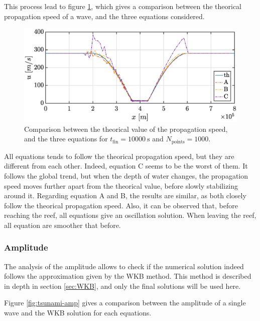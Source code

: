 \documentclass[a4paper,12pt,twoside]{article}
\begin{document}
        This process lead to figure \ref{fig:tsunami_speed}, which gives a comparison between the theorical propagation speed of a wave, and the three equations considered.

        \begin{figure}[h]
          \centering
          \includegraphics[width=\textwidth]{graphs/tsunami_speed.eps}
          \caption{Comparison between the theorical value of the propagation speed, and the three equations for $t_\text{fin} = \SI{10000}{\s}$ and $N_\text{points} = \num{1000}$.}
          \label{fig:tsunami_speed}
        \end{figure}

        All equations tends to follow the theorical propagation speed, but they are different from each other.
        Indeed, equation C seems to be the worst of them.
        It follows the global trend, but when the depth of water changes, the propagation speed moves further apart from the theorical value, before slowly stabilizing around it.
        Regarding equation A and B, the results are similar, as both closely follow the theorical propagation speed.
        Also, it can be observed that, before reaching the reef, all equations give an oscillation solution.
        When leaving the reef, all equation are smoother that before. %

      \subsubsection{Amplitude}
      The analysis of the amplitude allows to check if the numerical solution indeed follows the approximation given by the WKB method.
      This method is described in depth in section \ref{sec:WKB}, and only the final solutions will be used here.

      Figure \ref{fig:tsunami-amp} gives a comparison between the amplitude of a single wave and the WKB solution for each equations.
\end{document}
